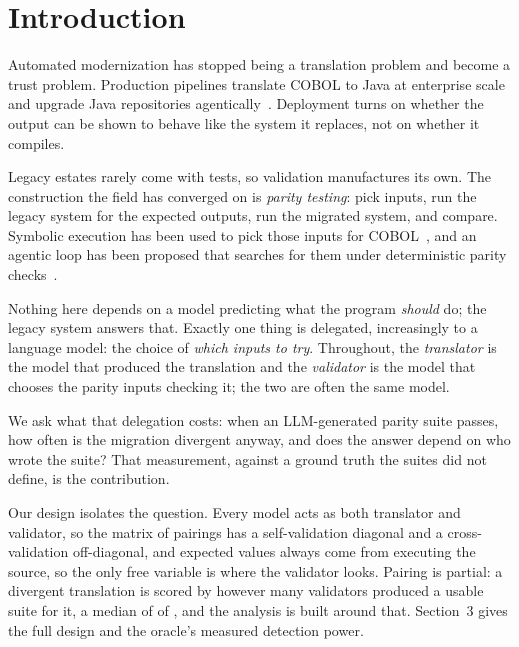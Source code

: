 \documentclass[sigconf]{acmart}
\begin{document}
\section{Introduction}

Automated modernization has stopped being a translation problem and become a trust problem.
Production pipelines translate COBOL to Java at enterprise
scale~\cite{chakravarthy2026enterprise} and upgrade Java repositories
agentically~\cite{liu2025migrationbench}. Deployment turns on whether the output can be shown
to behave like the system it replaces, not on whether it compiles.

Legacy estates rarely come with tests, so validation manufactures its own. The construction the
field has converged on is \emph{parity testing}: pick inputs, run the legacy system for the
expected outputs, run the migrated system, and compare. Symbolic execution
has been used to pick those inputs for COBOL~\cite{kumar2024validation,hans2025testing}, and an
agentic loop has been proposed that searches for them under deterministic parity
checks~\cite{ferenczi2026locksmith}.

Nothing here depends on a model predicting what the program \emph{should} do; the legacy system
answers that. Exactly one thing is delegated, increasingly to a language model: the choice of
\emph{which inputs to try}. Throughout, the \emph{translator} is the model that produced the
translation and the \emph{validator} is the model that chooses the parity inputs checking it;
the two are often the same model.

We ask what that delegation costs: when an LLM-generated parity suite passes, how often is the
migration divergent anyway, and does the answer depend on who wrote the suite? That
measurement, against a ground truth the suites did not define, is the contribution.

Our design isolates the question. Every model acts as both translator and validator, so the
matrix of pairings has a self-validation diagonal and a cross-validation off-diagonal, and
expected values always come from executing the source, so the only free variable is where the
validator looks. Pairing is partial: a divergent translation is scored by however many
validators produced a usable suite for it, a median of \PairMedian{} of \NModels{}, and the
analysis is built around that. Section~3 gives the full design and the oracle's measured
detection power.
\end{document}

